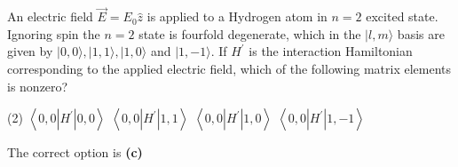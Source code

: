 \begin{enumerate}
\begin{answer}
$$		$$
	\end{answer}
	\begin{minipage}{\textwidth}
		\item An electric field $\vec{E}=E_{0} \hat{z}$ is applied to a Hydrogen atom in $n=2$ excited state. Ignoring spin the $n=2$ state is fourfold degenerate, which in the $|l, m\rangle$ basis are given by $|0,0\rangle,|1,1\rangle,|1,0\rangle$ and $|1,-1\rangle$. If $H^{\prime}$ is the interaction Hamiltonian corresponding to the applied electric field, which of the following matrix elements is nonzero?
	\end{minipage}
	\begin{tasks}(2)
		\task[\textbf{A.}] $\left\langle 0,0\left|H^{\prime}\right| 0,0\right\rangle$
		\task[\textbf{B.}] $\left\langle 0,0\left|H^{\prime}\right| 1,1\right\rangle$
		\task[\textbf{C.}]$\left\langle 0,0\left|H^{\prime}\right| 1,0\right\rangle$
		\task[\textbf{D.}] $\left\langle 0,0\left|H^{\prime}\right| 1,-1\right\rangle$
	\end{tasks}
	\begin{answer}
		The correct option is \textbf{(c)}
	\end{answer}
\end{enumerate}
